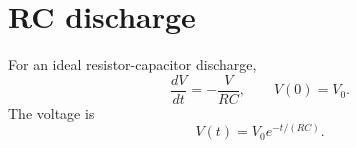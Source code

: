 %
%
%
%

\section*{RC discharge}
For an ideal resistor-capacitor discharge,
\[
  \frac{dV}{dt}=-\frac{V}{RC},\qquad V(0)=V_0.
\]
The voltage is
\[
  V(t)=V_0 e^{-t/(RC)}.
\]
